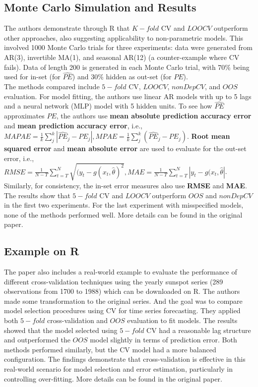 \documentclass[12pt, oneside]{amsart}
\theoremstyle{definition}
\theoremstyle{remark}
\numberwithin{equation}{section}
\begin{document}
\subsection{Monte Carlo Simulation and Results}
The authors demonstrate through R that $K-fold$ CV and $LOOCV$ outperform other approaches, also suggesting applicability to non-parametric models. This involved 1000 Monte Carlo trials for three experiments: data were generated from AR(3), invertible MA(1), and seasonal AR(12) (a counter-example where CV fails). Data of length 200 is generated in each Monte Carlo trial, with 70\% being used for in-set (for $\hat{PE}$) and 30\% hidden as out-set (for $PE$).\\

The methods compared include $5-fold$ CV, $LOOCV$, $nonDepCV$, and $OOS$ evaluation. For model fitting, the authors use linear AR models with up to 5 lags and a neural network (MLP) model with 5 hidden units.
To see how $\hat{PE}$ approximates $PE$, the authors use \textbf{mean absolute prediction accuracy error} and \textbf{mean prediction accuracy error}, i.e., $MAPAE = \frac{1}{k} \sum_j^k | \hat{PE}_j - PE_j|, MPAE = \frac{1}{k} \sum_j^k ( \hat{PE}_j - PE_j)$.
\textbf{Root mean squared error} and \textbf{mean absolute error} are used to evaluate for the out-set error, i.e., $RMSE = \frac{1}{N-T} \sum_{t=T}^N \sqrt{(y_t - g(x_t, \hat{\theta})^2}, MAE = \frac{1}{N-T} \sum_{t=T}^N |y_t - g(x_t, \hat{\theta}|$. Similarly, for consistency, the in-set error measures also use \textbf{RMSE} and \textbf{MAE}.\\

The results show that $5-fold$ CV and $LOOCV$ outperform $OOS$ and $nonDepCV$ in the first two experiments. For the last experiment with misspecified models, none of the methods performed well. More details can be found in the original paper.

\subsection{Example on R}
The paper also includes a real-world example to evaluate the performance of different cross-validation techniques using the yearly sunspot series (289 observations from 1700 to 1988) which can be downloaded on R. The authors made some transformation to the original series. And the goal was to compare model selection procedures using CV for time series forecasting. They applied both $5-fold$ cross-validation and $OOS$ evaluation to fit models. The results showed that the model selected using $5-fold$ CV had a reasonable lag structure and outperformed the $OOS$ model slightly in terms of prediction error. Both methods performed similarly, but the CV model had a more balanced configuration. The findings demonstrate that cross-validation is effective in this real-world scenario for model selection and error estimation, particularly in controlling over-fitting. More details can be found in the original paper.
\end{document}
